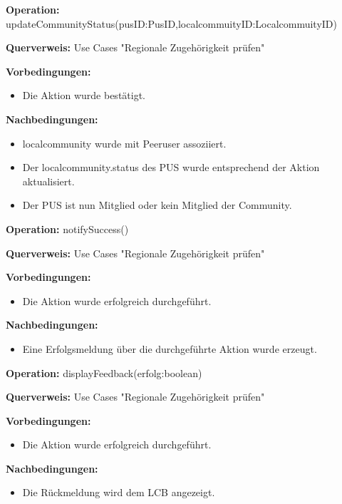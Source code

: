 \documentclass[a4paper,12pt]{article}
\begin{document}
	
	\begin{contractbox}
		\textbf{Operation:} updateCommunityStatus(pusID:PusID,localcommuityID:LocalcommuityID)
		
		\textbf{Querverweis:} Use Cases "Regionale Zugehörigkeit prüfen"
		
		\textbf{Vorbedingungen:}
		\begin{itemize}[noitemsep]
			\item Die Aktion wurde bestätigt.
		\end{itemize}
		
		\textbf{Nachbedingungen:}
		\begin{itemize}[noitemsep]
			\item localcommunity wurde mit Peeruser assoziiert. 
			\item Der localcommunity.status des PUS wurde entsprechend der Aktion aktualisiert.
			\item Der PUS ist nun Mitglied oder kein Mitglied der Community.
		\end{itemize}
	\end{contractbox}
	
	
	\begin{contractbox}
		\textbf{Operation:} notifySuccess()
		
		\textbf{Querverweis:} Use Cases "Regionale Zugehörigkeit prüfen"
		
		\textbf{Vorbedingungen:}
		\begin{itemize}[noitemsep]
			\item Die Aktion wurde erfolgreich durchgeführt.
		\end{itemize}
		
		\textbf{Nachbedingungen:}
		\begin{itemize}[noitemsep]
			\item Eine Erfolgsmeldung über die durchgeführte Aktion wurde erzeugt.
		\end{itemize}
	\end{contractbox}
	
	\begin{contractbox}
		\textbf{Operation:} displayFeedback(erfolg:boolean)
		
		\textbf{Querverweis:} Use Cases "Regionale Zugehörigkeit prüfen"
		
		\textbf{Vorbedingungen:}
		\begin{itemize}[noitemsep]
			\item Die Aktion wurde erfolgreich durchgeführt.
		\end{itemize}
		
		\textbf{Nachbedingungen:}
		\begin{itemize}[noitemsep]
			\item Die Rückmeldung wird dem LCB angezeigt.
		\end{itemize}
	\end{contractbox}
	
\end{document}
